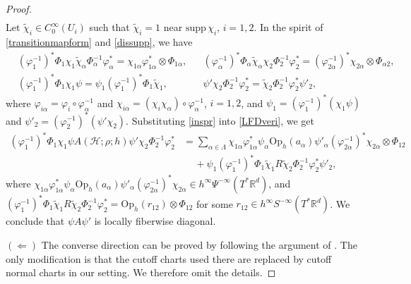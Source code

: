 \documentclass[11pt,oneside,reqno]{amsart}
\newcommand\R{\ensuremath{\mathbb{R}}}
\newcommand\Oph{\ensuremath{\mathrm{Op}_h}}
\theoremstyle{definition}
\numberwithin{equation}{section}
\theoremstyle{plain}
\begin{document}
\begin{proof}
\begin{equation}
\begin{aligned}
    \end{aligned}
\end{equation}
Let $\widetilde{\chi}_i \in C_0^\infty(U_i) $ such that $\widetilde{\chi}_i =1$ near $\mathrm{supp}\, \chi_i$, $i=1,2$. In the spirit of \eqref{transitionmapform} and \eqref{dissupp}, we have
\begin{equation}\label{inspr}
    \begin{aligned}
        & (\varphi^{-1}_1)^{*}\Phi_1\chi_1\widetilde{\chi}_{\alpha}\Phi_{\alpha}^{-1} \varphi_{\alpha}^* = \chi_{1\alpha} \varphi_{1\alpha}^* \otimes \Phi_{1\alpha}, &&  (\varphi_{\alpha}^{-1})^* \Phi_{\alpha} \widetilde{\chi}_{\alpha} \chi_2\Phi^{-1}_2\varphi^{*}_2 = (\varphi_{2\alpha }^{-1})^* \chi_{2\alpha } \otimes \Phi_{\alpha 2}, \\
        & (\varphi^{-1}_1)^{*}\Phi_1\chi_1\psi= \psi_1 (\varphi^{-1}_1)^{*}\Phi_1\widetilde{\chi}_1, && \psi' \chi_2\Phi^{-1}_2\varphi^{*}_2 = \widetilde{\chi}_2 \Phi^{-1}_2\varphi^{*}_2 \psi'_2,
    \end{aligned}
\end{equation}
where $\varphi_{i\alpha} = \varphi_i  \circ \varphi_\alpha^{-1}$ and $\chi_{i \alpha } = (\chi_i \chi_\alpha  ) \circ \varphi_\alpha^{-1}$, $i=1,2$, and $\psi_1  = (\varphi_1^{-1})^*  (\chi_1 \psi  )$ and $\psi'_2 = (\varphi_2^{-1})^*  ( \psi' \chi_2)$. Substituting \eqref{inspr} into \eqref{LFDveri}, we get
\begin{equation}
    \begin{aligned}
        (\varphi^{-1}_1)^{*}\Phi_1\chi_1 \psi A(\mathcal{H};\rho;h) \psi '\chi_2\Phi^{-1}_2\varphi^{*}_2 
&= \sum_{\alpha\in \Lambda}  \chi_{1\alpha} \varphi_{1\alpha}^* \psi_\alpha \Oph(a_{\alpha} )\psi'_\alpha (\varphi_{2\alpha }^{-1})^* \chi_{2\alpha }  \otimes \Phi_{12}    \\
        &\quad\, + \psi_1 (\varphi^{-1}_1)^{*}\Phi_1\widetilde{\chi}_1 R\widetilde{\chi}_2 \Phi^{-1}_2\varphi^{*}_2 \psi'_2 ,
    \end{aligned}
\end{equation}
where $\chi_{1\alpha} \varphi_{1\alpha}^* \psi_\alpha \Oph(a_{\alpha} )\psi'_\alpha (\varphi_{2\alpha }^{-1})^* \chi_{2\alpha }  \in h^\infty \Psi^{-\infty}(T^*\R^d) $, and $(\varphi^{-1}_1)^{*}\Phi_1\widetilde{\chi}_1 R\widetilde{\chi}_2 \Phi^{-1}_2\varphi^{*}_2 = \Oph(r_{12}) \otimes  \Phi_{12}$ for some $r_{12} \in h^\infty S^{-\infty}(T^*\R^d)$. We conclude that $\psi A \psi'$ is locally fiberwise diagonal.

$(\Leftarrow)$ The converse direction can be proved by following the argument of \cite[Proposition E.13]{dyatlovzworski2019resonances}. The only modification is that the cutoff charts used there are replaced by cutoff normal charts in our setting. We therefore omit the details.
\end{proof}
\end{document}
